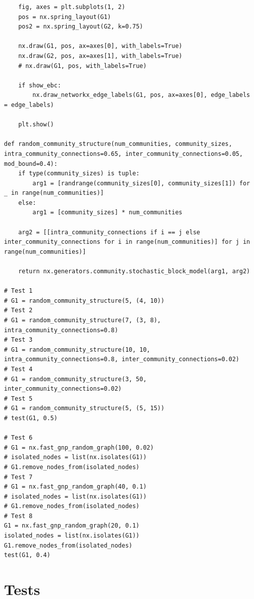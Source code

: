 \documentclass{article}
\begin{document}
\begin{verbatim}
    fig, axes = plt.subplots(1, 2)
    pos = nx.spring_layout(G1)
    pos2 = nx.spring_layout(G2, k=0.75)

    nx.draw(G1, pos, ax=axes[0], with_labels=True)
    nx.draw(G2, pos, ax=axes[1], with_labels=True)
    # nx.draw(G1, pos, with_labels=True)

    if show_ebc:
        nx.draw_networkx_edge_labels(G1, pos, ax=axes[0], edge_labels = edge_labels)

    plt.show()

def random_community_structure(num_communities, community_sizes, intra_community_connections=0.65, inter_community_connections=0.05, mod_bound=0.4):
    if type(community_sizes) is tuple:
        arg1 = [randrange(community_sizes[0], community_sizes[1]) for _ in range(num_communities)]
    else:
        arg1 = [community_sizes] * num_communities

    arg2 = [[intra_community_connections if i == j else inter_community_connections for i in range(num_communities)] for j in range(num_communities)]

    return nx.generators.community.stochastic_block_model(arg1, arg2)

# Test 1
# G1 = random_community_structure(5, (4, 10))
# Test 2
# G1 = random_community_structure(7, (3, 8), intra_community_connections=0.8)
# Test 3
# G1 = random_community_structure(10, 10, intra_community_connections=0.8, inter_community_connections=0.02)
# Test 4
# G1 = random_community_structure(3, 50, inter_community_connections=0.02)
# Test 5
# G1 = random_community_structure(5, (5, 15))
# test(G1, 0.5)

# Test 6
# G1 = nx.fast_gnp_random_graph(100, 0.02)
# isolated_nodes = list(nx.isolates(G1))
# G1.remove_nodes_from(isolated_nodes)
# Test 7
# G1 = nx.fast_gnp_random_graph(40, 0.1)
# isolated_nodes = list(nx.isolates(G1))
# G1.remove_nodes_from(isolated_nodes)
# Test 8
G1 = nx.fast_gnp_random_graph(20, 0.1)
isolated_nodes = list(nx.isolates(G1))
G1.remove_nodes_from(isolated_nodes)
test(G1, 0.4)

\end{verbatim}

\section{Tests}
\end{document}
